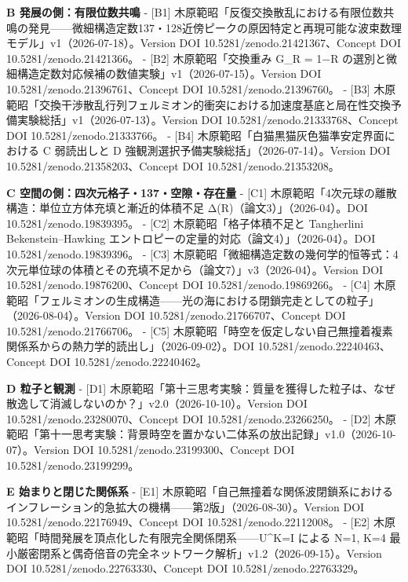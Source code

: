 \documentclass[
  a4paper,
]{ltjsarticle}
\begin{document}
\textbf{B 発展の側：有限位数共鳴} - {[}B1{]}
木原範昭「反復交換散乱における有限位数共鳴の発見------微細構造定数137・128近傍ピークの原因特定と再現可能な波束数理モデル」v1（2026-07-18）。Version
DOI 10.5281/zenodo.21421367、Concept DOI 10.5281/zenodo.21421366。 -
{[}B2{]} 木原範昭「交換重み G\_R = 1−R
の選別と微細構造定数対応候補の数値実験」v1（2026-07-15）。Version DOI
10.5281/zenodo.21396761、Concept DOI 10.5281/zenodo.21396760。 -
{[}B3{]}
木原範昭「交換干渉散乱行列フェルミオン的衝突における加速度基底と局在性交換予備実験総括」v1（2026-07-13）。Version
DOI 10.5281/zenodo.21333768、Concept DOI 10.5281/zenodo.21333766。 -
{[}B4{]} 木原範昭「白猫黒猫灰色猫準安定界面における C 弱読出しと D
強観測選択予備実験総括」（2026-07-14）。Version DOI
10.5281/zenodo.21358203、Concept DOI 10.5281/zenodo.21353208。

\textbf{C 空間の側：四次元格子・137・空隙・存在量} - {[}C1{]}
木原範昭「4次元球の離散構造：単位立方体充填と漸近的体積不足
Δ(R)（論文3）」（2026-04）。DOI 10.5281/zenodo.19839395。 - {[}C2{]}
木原範昭「格子体積不足と Tangherlini Bekenstein--Hawking
エントロピーの定量的対応（論文4）」（2026-04）。DOI
10.5281/zenodo.19839396。 - {[}C3{]}
木原範昭「微細構造定数の幾何学的恒等式：4次元単位球の体積とその充填不足から（論文7）」v3（2026-04）。Version
DOI 10.5281/zenodo.19876200、Concept DOI 10.5281/zenodo.19869266。 -
{[}C4{]}
木原範昭「フェルミオンの生成構造------光の海における閉鎖完走としての粒子」（2026-08-04）。Version
DOI 10.5281/zenodo.21766707、Concept DOI 10.5281/zenodo.21766706。 -
{[}C5{]}
木原範昭「時空を仮定しない自己無撞着複素関係系からの熱力学的読出し」（2026-09-02）。DOI
10.5281/zenodo.22240463、Concept DOI 10.5281/zenodo.22240462。

\textbf{D 粒子と観測} - {[}D1{]}
木原範昭「第十三思考実験：質量を獲得した粒子は、なぜ散逸して消滅しないのか？」v2.0（2026-10-10）。Version
DOI 10.5281/zenodo.23280070、Concept DOI 10.5281/zenodo.23266250。 -
{[}D2{]}
木原範昭「第十一思考実験：背景時空を置かない二体系の放出記録」v1.0（2026-10-07）。Version
DOI 10.5281/zenodo.23199300、Concept DOI 10.5281/zenodo.23199299。

\textbf{E 始まりと閉じた関係系} - {[}E1{]}
木原範昭「自己無撞着な関係波閉鎖系におけるインフレーション的急拡大の機構------第2版」（2026-08-30）。Version
DOI 10.5281/zenodo.22176949、Concept DOI 10.5281/zenodo.22112008。 -
{[}E2{]} 木原範昭「時間発展を頂点化した有限完全関係閉系------U\^{}K=I
による N=1, K=4
最小厳密閉系と偶奇倍音の完全ネットワーク解析」v1.2（2026-09-15）。Version
DOI 10.5281/zenodo.22763330、Concept DOI 10.5281/zenodo.22763329。
\end{document}
